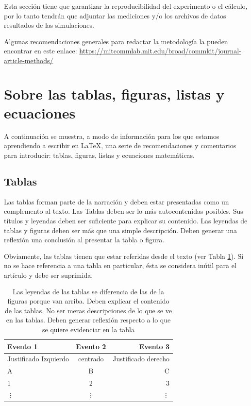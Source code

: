 \documentclass[spanish,notitlepage,letterpaper,11pt]{article} %
\begin{document}
Esta sección tiene que garantizar la reproducibilidad del experimento o el cálculo, por lo tanto tendrán que adjuntar las mediciones y/o los archivos de datos resultados de las simulaciones. 

Algunas recomendaciones generales para redactar la metodología la pueden encontrar en este enlace: \url{https://mitcommlab.mit.edu/broad/commkit/journal-article-methods/}

\section*{Sobre las tablas, figuras, listas y ecuaciones}

A continuación se muestra, a modo de información para los que estamos aprendiendo a escribir en \LaTeX,  una serie de recomendaciones y comentarios para introducir: tablas, figuras, listas y ecuaciones matemáticas. 

\subsection*{Tablas}
Las tablas forman parte de la narración y deben estar presentadas como un complemento al texto. Las Tablas deben ser lo más autocontenidas posibles. Sus títulos y  leyendas deben ser suficiente para explicar su contenido. Las leyendas de tablas y figuras deben ser más que una simple descripción. Deben generar una reflexión una conclusión al presentar la tabla o figura.

Obviamente, las tablas tienen que estar referidas desde el texto (ver Tabla \ref{Tabla1}). Si no se hace referencia a una tabla en particular, ésta se considera inútil para el artículo y debe ser suprimida.
\begin{table}[!ht]
  \centering
  \caption{Las leyendas de las tablas se diferencia de las de la figuras porque van arriba. Deben explicar el contenido de las tablas. No ser meras descripciones de lo que se ve en las tablas. Deben generar reflexión respecto a lo que se quiere evidenciar en la tabla }  
  \vspace{0.3cm}
\begin{tabular}{|l|c|r|} 
\hline
  Evento 1 & Evento 2  & Evento 3  \\ \hline \hline
  Justificado Izquierdo & centrado & Justificado derecho \\\hline  
  A & B  & C \\ \hline 
  1 & 2 & 3 \\ \hline 
 \vdots & \vdots & \vdots \\  \hline \hline
\end{tabular}   
  \label{Tabla1}
\end{table}
\end{document}
